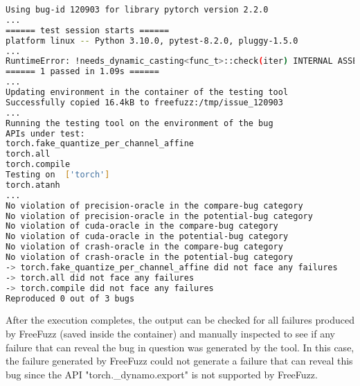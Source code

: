 \documentclass[sigconf,screen]{acmart}
\begin{document}
\begin{lstlisting}[language=bash,basicstyle=\small,keywords={}]
Using bug-id 120903 for library pytorch version 2.2.0
...
====== test session starts ======
platform linux -- Python 3.10.0, pytest-8.2.0, pluggy-1.5.0
...
RuntimeError: !needs_dynamic_casting<func_t>::check(iter) INTERNAL ASSERT FAILED at "../aten/src/ATen/native/cpu/Loops.h":310, please report a bug to PyTorch.
====== 1 passed in 1.09s ======
...
Updating environment in the container of the testing tool
Successfully copied 16.4kB to freefuzz:/tmp/issue_120903
...
Running the testing tool on the environment of the bug
APIs under test:
torch.fake_quantize_per_channel_affine
torch.all
torch.compile
Testing on  ['torch']
torch.atanh
...
No violation of precision-oracle in the compare-bug category
No violation of precision-oracle in the potential-bug category
No violation of cuda-oracle in the compare-bug category
No violation of cuda-oracle in the potential-bug category
No violation of crash-oracle in the compare-bug category
No violation of crash-oracle in the potential-bug category
-> torch.fake_quantize_per_channel_affine did not face any failures
-> torch.all did not face any failures
-> torch.compile did not face any failures
Reproduced 0 out of 3 bugs
\end{lstlisting}


After the execution completes, the output can be
checked for all failures produced by FreeFuzz (saved inside the
container) and manually inspected to see if any failure that can
reveal the bug in question was generated by the tool. In this case,
the failure generated by FreeFuzz could not generate a failure that
can reveal this bug since the API "torch.\_dynamo.export" is not
supported by FreeFuzz.
\end{document}
